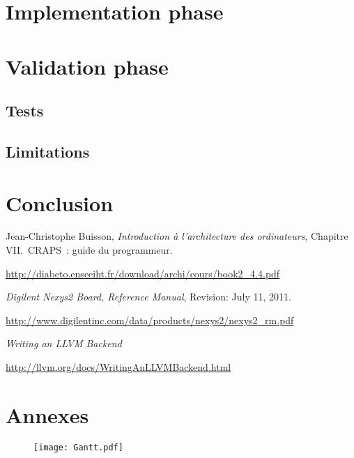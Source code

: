 \documentclass[openany]{book}
\begin{document}
  \chapter{Implementation phase}

  \chapter{Validation phase}
    \section{Tests}
    \section{Limitations}

  \chapter{Conclusion}

  \begin{thebibliography}{9}
      Jean-Christophe Buisson,
      \emph{Introduction à l'architecture des ordinateurs},
      Chapitre VII.\ CRAPS~: guide du programmeur.

      \mbox{\url{http://diabeto.enseeiht.fr/download/archi/cours/book2_4.4.pdf}}

      \emph{Digilent Nexys2 Board, Reference Manual},
      Revision: July 11, 2011.

      \mbox{\url{http://www.digilentinc.com/data/products/nexys2/nexys2_rm.pdf}}

      \emph{Writing an LLVM Backend}

      \mbox{\url{http://llvm.org/docs/WritingAnLLVMBackend.html}}
  \end{thebibliography}

  \chapter*{Annexes}
    \thispagestyle{empty}
    \begin{figure}
      \centering
      \texttt{[image: Gantt.pdf]}
      \label{fig:gantt}
    \end{figure}
    \clearpage
    \restoregeometry
\end{document}
